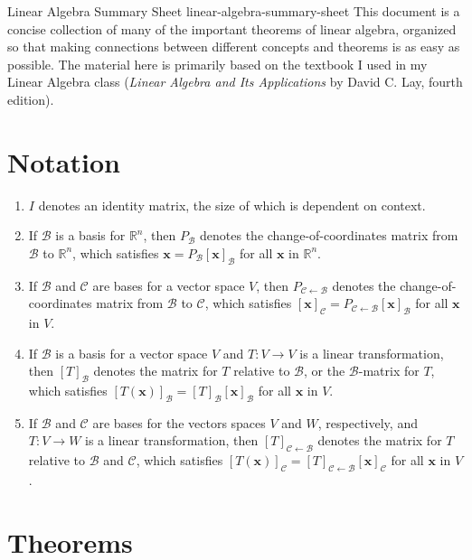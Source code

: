 \documentclass{myart}
\renewcommand{\vec}[1]{\ensuremath{\mathbf{#1}}}
\newcommand{\R}[1][]{\ensuremath{\mathbb{R}^{#1}}}
\newcommand{\basis}[1]{\ensuremath{\mathcal{#1}}}
\newcommand{\from}{\leftarrow}
\newcommand{\coord}[2]{\ensuremath{\left[#1\right]_{#2}}}
\newcommand{\chcoordr}[1]{\ensuremath{P_{#1}}}
\newcommand{\chcoord}[2]{\ensuremath{P_{#1 \from #2}}}
\newcommand{\transmat}[2]{\coord{#1}{#2}}
\newcommand{\transmatb}[3]{\coord{#1}{#2 \from #3}}
\theoremstyle{definition}
\begin{document}
\titlepage
{Linear Algebra Summary Sheet}
{linear-algebra-summary-sheet}
{This document is a concise collection of many of the important
  theorems of linear algebra, organized so that making connections
  between different concepts and theorems is as easy as possible. The
  material here is primarily based on the textbook I used in my Linear
  Algebra class (\textit{Linear Algebra and Its Applications} by David
  C. Lay, fourth edition).}

\section{Notation}

\begin{enumerate}
\item $I$ denotes an identity matrix, the size of which is dependent
  on context.
\item If \basis B is a basis for \R[n], then \chcoordr{\basis B}
  denotes the change-of-coordinates matrix from \basis B to \R[n],
  which satisfies $\vec x = \chcoordr{\basis B}\coord{\vec x}{\basis
    B}$ for all \vec x in \R[n].
\item If \basis B and \basis C are bases for a vector space $V$, then
  \chcoord{\basis C}{\basis B} denotes the change-of-coordinates
  matrix from \basis B to \basis C, which satisfies $\coord{\vec
    x}{\basis C} = \chcoord{\basis C}{\basis B}\coord{\vec x}{\basis
    B}$ for all \vec x in $V$.
\item If \basis B is a basis for a vector space $V$ and $T: V \to V$
  is a linear transformation, then \transmat{T}{\basis B} denotes the
  matrix for $T$ relative to \basis B, or the \basis B-matrix for $T$,
  which satisfies $\coord{T(\vec x)}{\basis B} = \transmat{T}{\basis
    B}\coord{\vec x}{\basis B}$ for all \vec x in $V$.
\item If \basis B and \basis C are bases for the vectors spaces $V$
  and $W$, respectively, and $T: V \to W$ is a linear transformation,
  then \transmatb{T}{\basis C}{\basis B} denotes the matrix for $T$
  relative to \basis B and \basis C, which satisfies $\coord{T(\vec
    x)}{\basis C} = \transmatb{T}{\basis C}{\basis B}\coord{\vec
    x}{\basis C}$ for all \vec x in $V$.
\end{enumerate}

\section{Theorems}
\end{document}
